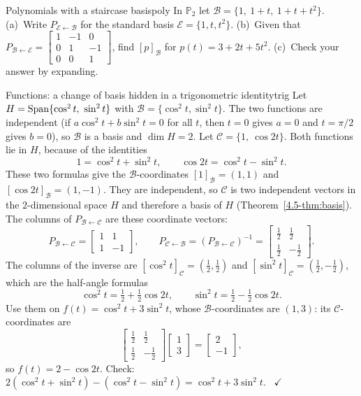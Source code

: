 \documentclass[11pt]{article}
\begin{document}
\begin{kc}{Polynomials with a staircase basis}{poly}
In $\mathbb{P}_2$ let $\mathcal{B}=\{1,\ 1+t,\ 1+t+t^2\}$. (a)~Write $P_{\mathcal{E}\leftarrow\mathcal{B}}$ for the standard basis $\mathcal{E}=\{1,t,t^2\}$. (b)~Given that $P_{\mathcal{B}\leftarrow\mathcal{E}}=\begin{bmatrix}1&-1&0\\0&1&-1\\0&0&1\end{bmatrix}$, find $[p]_{\mathcal{B}}$ for $p(t)=3+2t+5t^2$. (c)~Check your answer by expanding.
\end{kc}

\begin{exmp}{Functions: a change of basis hidden in a trigonometric identity}{trig}
Let $H=\operatorname{Span}\{\cos^2t,\ \sin^2t\}$ with $\mathcal{B}=\{\cos^2t,\sin^2t\}$. The two functions are independent (if $a\cos^2t+b\sin^2t=0$ for all $t$, then $t=0$ gives $a=0$ and $t=\pi/2$ gives $b=0$), so $\mathcal{B}$ is a basis and $\dim H=2$. Let $\mathcal{C}=\{1,\ \cos2t\}$. Both functions lie in $H$, because of the identities
\[
1=\cos^2t+\sin^2t,\qquad \cos2t=\cos^2t-\sin^2t.
\]
These two formulas give the $\mathcal{B}$-coordinates $[1]_{\mathcal{B}}=(1,1)$ and $[\cos2t]_{\mathcal{B}}=(1,-1)$. They are independent, so $\mathcal{C}$ is two independent vectors in the $2$-dimensional space $H$ and therefore a basis of $H$ (Theorem~\ref{4.5-thm:basis}). The columns of $P_{\mathcal{B}\leftarrow\mathcal{C}}$ are these coordinate vectors:
\[
P_{\mathcal{B}\leftarrow\mathcal{C}}=\begin{bmatrix}1&1\\1&-1\end{bmatrix},\qquad P_{\mathcal{C}\leftarrow\mathcal{B}}=\left(P_{\mathcal{B}\leftarrow\mathcal{C}}\right)^{-1}=\begin{bmatrix}\tfrac12&\tfrac12\\\tfrac12&-\tfrac12\end{bmatrix}.
\]
The columns of the inverse are $[\cos^2t]_{\mathcal{C}}=(\tfrac12,\tfrac12)$ and $[\sin^2t]_{\mathcal{C}}=(\tfrac12,-\tfrac12)$, which are the half-angle formulas
\[
\cos^2t=\tfrac12+\tfrac12\cos2t,\qquad \sin^2t=\tfrac12-\tfrac12\cos2t.
\]
Use them on $f(t)=\cos^2t+3\sin^2t$, whose $\mathcal{B}$-coordinates are $(1,3)$: its $\mathcal{C}$-coordinates are
\[
\begin{bmatrix}\tfrac12&\tfrac12\\\tfrac12&-\tfrac12\end{bmatrix}\begin{bmatrix}1\\3\end{bmatrix}=\begin{bmatrix}2\\-1\end{bmatrix},
\]
so $f(t)=2-\cos2t$. Check: $2(\cos^2t+\sin^2t)-(\cos^2t-\sin^2t)=\cos^2t+3\sin^2t$. \ $\checkmark$
\end{exmp}
\end{document}
